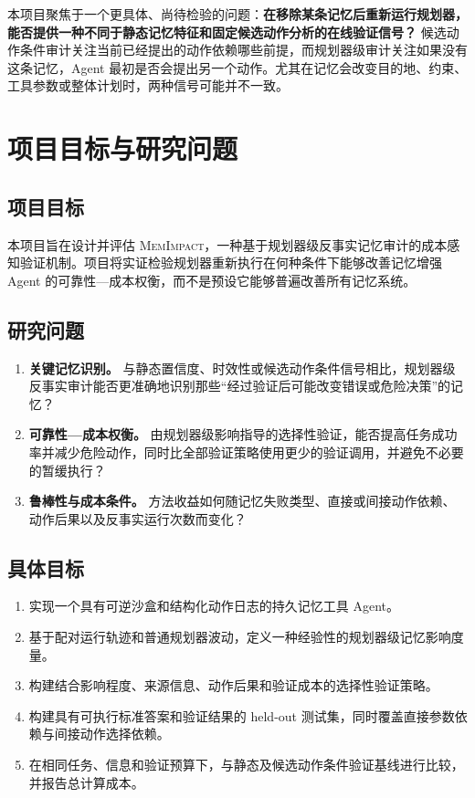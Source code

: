 \documentclass[11pt]{article}
\newcommand{\method}{\textsc{MemImpact}}
\begin{document}
本项目聚焦于一个更具体、尚待检验的问题：\textbf{在移除某条记忆后重新运行规划器，能否提供一种不同于静态记忆特征和固定候选动作分析的在线验证信号？} 候选动作条件审计关注当前已经提出的动作依赖哪些前提，而规划器级审计关注如果没有这条记忆，Agent 最初是否会提出另一个动作。尤其在记忆会改变目的地、约束、工具参数或整体计划时，两种信号可能并不一致。

\section{项目目标与研究问题}

\subsection{项目目标}

本项目旨在设计并评估 \method，一种基于规划器级反事实记忆审计的成本感知验证机制。项目将实证检验规划器重新执行在何种条件下能够改善记忆增强 Agent 的可靠性—成本权衡，而不是预设它能够普遍改善所有记忆系统。

\subsection{研究问题}

\begin{enumerate}[label=\textbf{RQ\arabic*：},leftmargin=3.2em]
  \item \textbf{关键记忆识别。} 与静态置信度、时效性或候选动作条件信号相比，规划器级反事实审计能否更准确地识别那些“经过验证后可能改变错误或危险决策”的记忆？
  \item \textbf{可靠性—成本权衡。} 由规划器级影响指导的选择性验证，能否提高任务成功率并减少危险动作，同时比全部验证策略使用更少的验证调用，并避免不必要的暂缓执行？
  \item \textbf{鲁棒性与成本条件。} 方法收益如何随记忆失败类型、直接或间接动作依赖、动作后果以及反事实运行次数而变化？
\end{enumerate}

\subsection{具体目标}

\begin{enumerate}
  \item 实现一个具有可逆沙盒和结构化动作日志的持久记忆工具 Agent。
  \item 基于配对运行轨迹和普通规划器波动，定义一种经验性的规划器级记忆影响度量。
  \item 构建结合影响程度、来源信息、动作后果和验证成本的选择性验证策略。
  \item 构建具有可执行标准答案和验证结果的 held-out 测试集，同时覆盖直接参数依赖与间接动作选择依赖。
  \item 在相同任务、信息和验证预算下，与静态及候选动作条件验证基线进行比较，并报告总计算成本。
\end{enumerate}
\end{document}
